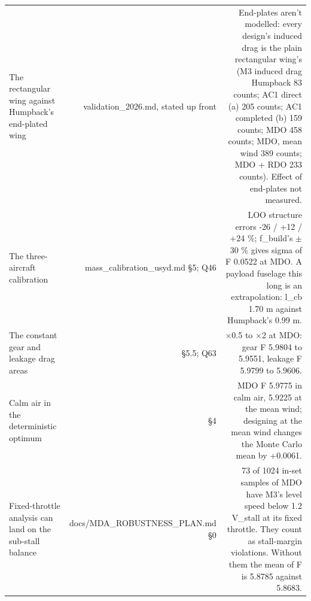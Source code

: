 \begin{table}[htbp]
{\begin{tabular}{lrr}
The rectangular wing against Humpback's end-plated wing & validation\_2026.md, stated up front & End-plates aren't modelled: every design's induced drag is the plain rectangular wing's (M3 induced drag Humpback 83 counts; AC1 direct (a) 205 counts; AC1 completed (b) 159 counts; MDO 458 counts; MDO, mean wind 389 counts; MDO + RDO 233 counts). Effect of end-plates not measured. \\
The three-aircraft calibration & mass\_calibration\_usyd.md §5; Q46 & LOO structure errors -26 / +12 / +24 \%; f\_build's $\pm$30 \% gives sigma of F 0.0522 at MDO. A payload fuselage this long is an extrapolation: l\_cb 1.70 m against Humpback's 0.99 m. \\
The constant gear and leakage drag areas & §5.5; Q63 & $\times$0.5 to $\times$2 at MDO: gear F 5.9804 to 5.9551, leakage F 5.9799 to 5.9606. \\
Calm air in the deterministic optimum & §4 & MDO F 5.9775 in calm air, 5.9225 at the mean wind; designing at the mean wind changes the Monte Carlo mean by +0.0061. \\
Fixed-throttle analysis can land on the sub-stall balance & docs/MDA\_ROBUSTNESS\_PLAN.md §0 & 73 of 1024 in-set samples of MDO have M3's level speed below 1.2 V\_stall at its fixed throttle. They count as stall-margin violations. Without them the mean of F is 5.8785 against 5.8683. \\
\bottomrule
\end{tabular}}
\end{table}
